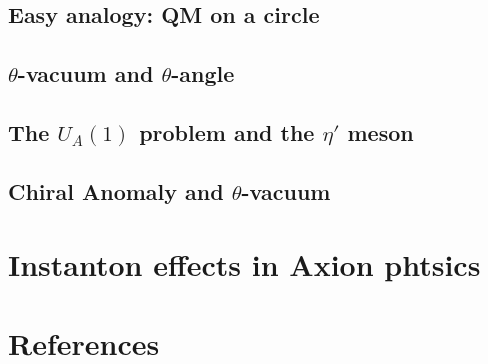 \documentclass{article}
\begin{document}
\subsection{Easy analogy: QM on a circle}
\subsection{$\theta$-vacuum and $\theta$-angle}
\subsection{The $U_A(1)$ problem and the $\eta'$ meson}
\subsection{Chiral Anomaly and $\theta$-vacuum}


\section{Instanton effects in Axion phtsics}

\section{References}
\end{document}
